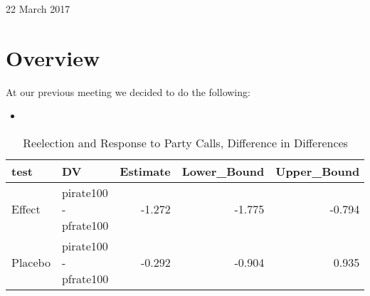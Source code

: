 \documentclass[12pt]{article}
\begin{document}
	
\begin{center}
	\Large 22 March 2017
\end{center}

\section{Overview}

At our previous meeting we decided to do the following:

\begin{itemize}
	\item
\end{itemize}

\begin{table}[H]
	\centering
	\caption{Reelection and Response to Party Calls, Difference in Differences} 
	\begin{tabular}{llrrr}
		\hline
		test & DV & Estimate & Lower\_Bound & Upper\_Bound \\ 
		\hline
		Effect & pirate100 - pfrate100 & -1.272 & -1.775 & -0.794 \\ 
		Placebo & pirate100 - pfrate100 & -0.292 & -0.904 & 0.935 \\ 
		\hline
	\end{tabular}
\end{table}
\end{document}
